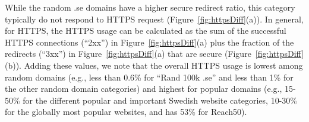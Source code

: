 \documentclass[letterpaper]{sig-alternate-10pt}
\begin{document}
While the random .se domains have a higher secure redirect ratio,
this category typically do not respond to HTTPS request (Figure~\ref{fig:httpsDiff}(a)). 
In general, for HTTPS,
the HTTPS usage can be calculated as the sum of the successful HTTPS connections
(``2xx'') in Figure~\ref{fig:httpsDiff}(a) plus the fraction of the redirects (``3xx'')
in Figure~\ref{fig:httpsDiff}(a) that are secure (Figure~\ref{fig:httpsDiff}(b)).
Adding these values, we note that the overall HTTPS usage 
is lowest among random domains 
(e.g., less than 0.6\% for ``Rand 100k .se'' and less than 1\% for the other random domain categories) 
and highest for popular domains (e.g., 15-50\% for the different popular and important Swedish website categories, 
10-30\% for the globally most popular websites, and has 53\% for Reach50).



\end{document}

